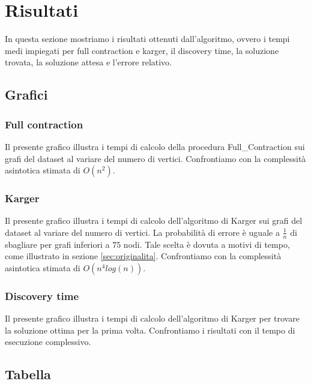\chapter{Risultati\label{sec:risultati}}
\noindent In questa sezione mostriamo i risultati ottenuti dall'algoritmo, ovvero i tempi medi impiegati per full contraction e karger, il discovery time, la soluzione trovata, la soluzione attesa e l'errore relativo.

\section{Grafici\label{sec:grafici}}

\subsection{Full contraction\label{sec:fc}}

Il presente grafico illustra i tempi di calcolo della procedura Full\_Contraction sui grafi del dataset al variare del numero di vertici. Confrontiamo con la complessità asintotica stimata di \(O(n^{2})\).

\subsection{Karger\label{sec:karger}}

Il presente grafico illustra i tempi di calcolo dell'algoritmo di Karger sui grafi del dataset al variare del numero di vertici. La probabilità di errore è uguale a \(\frac{1}{n}\) di sbagliare per grafi inferiori a $75$ nodi. Tale scelta è dovuta a motivi di tempo, come illustrato in sezione \vref{sec:originalita}. Confrontiamo con la complessità asintotica stimata di \(O(n^{4}log(n))\).

\subsection{Discovery time\label{sec:dt}}

Il presente grafico illustra i tempi di calcolo dell'algoritmo di Karger per trovare la soluzione ottima per la prima volta. Confrontiamo i risultati con il tempo di esecuzione complessivo.


\section{Tabella\label{sec:tabella}}

